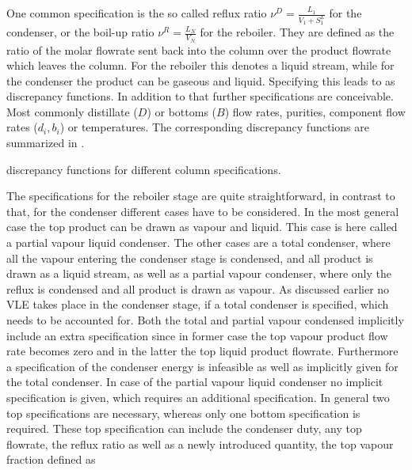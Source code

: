         One common specification is the so called reflux ratio $\nu^D = \frac{L_1}{V_1 + S_1^L}$ for
        the condenser, or the boil-up ratio $\nu^R = \frac{L_N}{V_N}$ for the reboiler.
        They are defined as the ratio of the molar flowrate sent back into the column over the
        product flowrate which leaves the column. For the reboiler this denotes a liquid stream,
        while for the condenser the product can be gaseous and liquid. Specifying this leads to
        as discrepancy functions. In addition to that further specifications are conceivable. Most
        commonly distillate ($D$) or bottoms ($B$) flow rates, purities, component flow rates ($d_i, b_i$)
        or temperatures. The corresponding discrepancy functions are summarized in .

        \begin{table}
            \centering
            \footnotesize
            
            \caption{discrepancy functions for different column specifications.}
            \label{tab:discrepancy}
        \end{table}

        The specifications for the reboiler stage are quite straightforward, in contrast to that,
        for the condenser different cases have to be considered. In the most general case the
        top product can be drawn as vapour and liquid. This case is here called a partial vapour
        liquid condenser. The other cases are a total condenser, where all the vapour entering the
        condenser stage is condensed, and all product is drawn as a liquid stream, as well as
        a partial vapour condenser, where only the reflux is condensed and all product is drawn
        as vapour. As discussed earlier no VLE takes place in the condenser stage, if a total
        condenser is specified, which needs to be accounted for. Both the total and partial
        vapour condensed implicitly include an extra specification since in former case
        the top vapour product flow rate becomes zero and in the latter the top liquid product
        flowrate. Furthermore a specification of the condenser energy is infeasible as well as implicitly
        given for the total condenser. In case of the partial vapour liquid condenser no implicit
        specification is given, which requires an additional specification. In general two
        top specifications are necessary, whereas only one bottom specification is required.
        These top specification can include the condenser duty, any top flowrate, the reflux ratio
        as well as a newly introduced quantity, the top vapour fraction defined as

